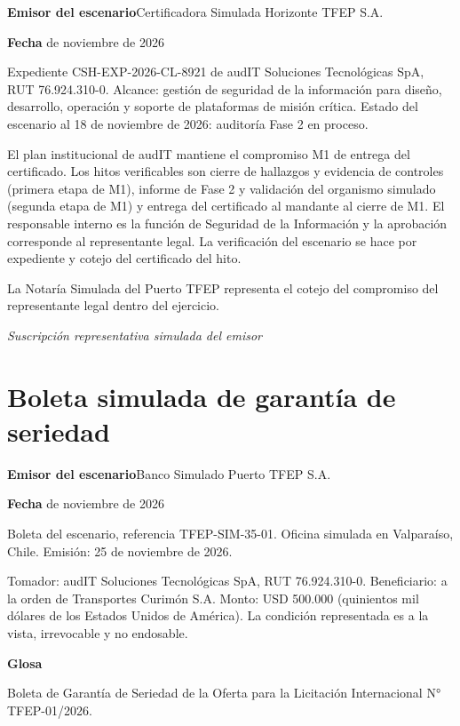 \rotuloSimuladoSobreUno
\noindent\textbf{Emisor del escenario}\enspace Certificadora Simulada Horizonte TFEP S.A.\par
\noindent\textbf{Fecha} de noviembre de 2026\par
\medskip

Expediente CSH-EXP-2026-CL-8921 de audIT Soluciones Tecnológicas SpA, RUT 76.924.310-0. Alcance: gestión de seguridad de la información para diseño, desarrollo, operación y soporte de plataformas de misión crítica. Estado del escenario al 18 de noviembre de 2026: auditoría Fase 2 en proceso.

El plan institucional de audIT mantiene el compromiso M1 de entrega del certificado. Los hitos verificables son cierre de hallazgos y evidencia de controles (primera etapa de M1), informe de Fase 2 y validación del organismo simulado (segunda etapa de M1) y entrega del certificado al mandante al cierre de M1. El responsable interno es la función de Seguridad de la Información y la aprobación corresponde al representante legal. La verificación del escenario se hace por expediente y cotejo del certificado del hito.

La Notaría Simulada del Puerto TFEP representa el cotejo del compromiso del representante legal dentro del ejercicio.

\medskip
\noindent\textit{Suscripción representativa simulada del emisor}\par
\label{adm:iso27001-fin}

\clearpage
\section*{Boleta simulada de garantía de seriedad}\label{adm:boleta}

\rotuloSimuladoSobreUno
\noindent\textbf{Emisor del escenario}\enspace Banco Simulado Puerto TFEP S.A.\par
\noindent\textbf{Fecha} de noviembre de 2026\par
\medskip

Boleta del escenario, referencia TFEP-SIM-35-01. Oficina simulada en Valparaíso, Chile. Emisión: 25 de noviembre de 2026.

Tomador: audIT Soluciones Tecnológicas SpA, RUT 76.924.310-0. Beneficiario: a la orden de Transportes Curimón S.A. Monto: USD 500.000 (quinientos mil dólares de los Estados Unidos de América). La condición representada es a la vista, irrevocable y no endosable.

\textbf{Glosa}\par
Boleta de Garantía de Seriedad de la Oferta para la Licitación Internacional N° TFEP-01/2026.

